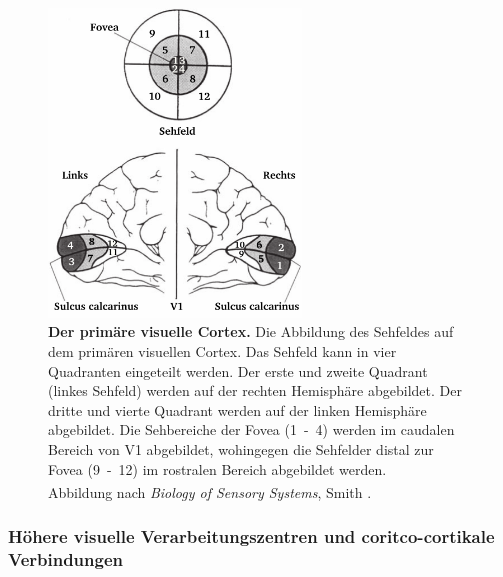 \begin{figure}[H]
    \centering
    \includegraphics[width = 0.6\textwidth]{pictures/visual/V1.png}
    \caption[Der primäre visuelle Cortex]{\textbf{Der primäre visuelle Cortex.} Die Abbildung des Sehfeldes auf dem primären visuellen Cortex. Das Sehfeld kann in vier Quadranten eingeteilt werden. Der erste und zweite Quadrant (linkes Sehfeld) werden auf der rechten Hemisphäre abgebildet. Der dritte und vierte Quadrant werden auf der linken Hemisphäre abgebildet. Die Sehbereiche der Fovea (1~-~4) werden im caudalen Bereich von V1 abgebildet, wohingegen die Sehfelder distal zur Fovea (9~-~12) im rostralen Bereich abgebildet werden.\\
    Abbildung nach \textit{Biology of Sensory Systems}, Smith \textsuperscript{\cite[Kap.~18]{smith2008biology}}.}
    \label{fig:V1}
\end{figure}


\subsubsection*{Höhere visuelle Verarbeitungszentren und coritco-cortikale Verbindungen}

